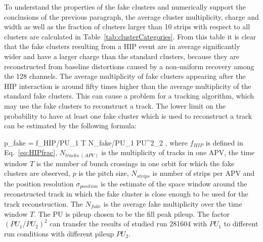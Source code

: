 To understand the properties of the fake clusters and numerically support the conclusions of the previous paragraph, the average cluster multiplicity, charge and width as well as the fraction of clusters larger than 10 strips with respect to all clusters are calculated in Table~\ref{tab:clusterCategories}. From this table it is clear that the fake clusters resulting from a HIP event are in average significantly wider and have a larger charge than the standard clusters, because they are reconstructed from baseline distortions caused by a non-uniform recovery among the 128 channels. The average multiplicity of fake clusters appearing after the HIP interaction is around fifty times higher than the average multiplicity of the standard fake clusters. This can cause a problem for a tracking algorithm, which may use the fake clusters to reconstruct a track. The lower limit on the probability to have at least one fake cluster which is used to reconstruct a track can be estimated by the following formula:


{
   p_{fake} = f_{HIP}/PU_{1} \times T  \times N_{fake}/PU_{1} \times PU^2_{2} \times  {}  ,
}
where $f_{HIP}$ is defined in Eq.~\ref{eq:HIPfrac}, $N_{tracks~(APV)}$ is the multiplicity of tracks in one APV, the time window $T$ is the number of bunch crossings in one orbit for which the fake clusters are observed, $p$ is the pitch size, $N_{strips}$ is number of strips per APV and the position resolution $\sigma_{position}$ is the estimate of the space window around the reconstructed track in which the fake cluster is close enough to be used for the track reconstruction. The $N_{fake}$ is the average fake multiplicity over the time window $T$. The PU is pileup chosen to be the fill peak pileup. The factor $(PU_{1}/PU_{2})^2$ can transfer the results of studied run 281604 with $PU_{1}$ to different run conditions with different pileup $PU_{2}$.  

